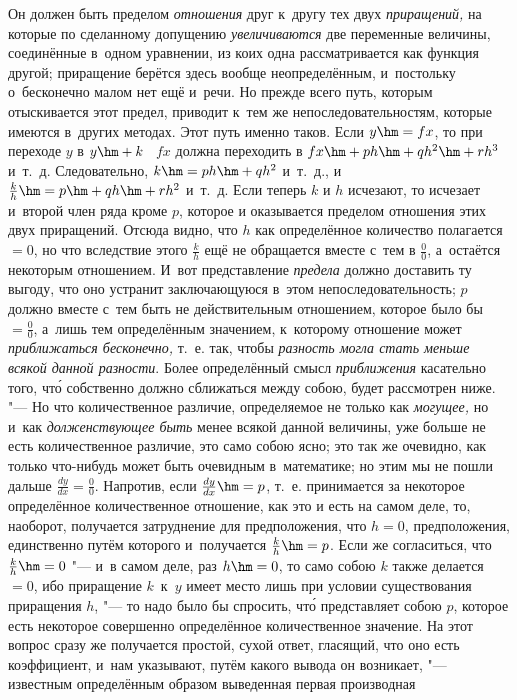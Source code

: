 Он должен быть пределом {\em отношения} друг к~другу тех двух {\em приращений,}
на которые по сделанному допущению {\em увеличиваются} две переменные величины,
соединённые в~одном уравнении, из коих одна рассматривается как функция другой;
приращение берётся здесь вообще неопределённым, и~постольку о~бесконечно малом
нет ещё и~речи. Но прежде всего путь, которым отыскивается этот предел,
приводит к~тем же непоследовательностям, которые имеются в~других методах. Этот
путь именно таков. Если $y\hm=fx$, то при переходе $y$ в $y\hm+k$ \  $fx$
должна переходить в $fx\hm+ph\hm+qh^2\hm+rh^3$ и~т.~д. Следовательно,
$k\hm=ph\hm+qh^2$ и~т.~д., и $\frac k h\hm=p\hm+qh\hm+rh^2$ и~т.~д. Если теперь
$k$ и $h$ исчезают, то исчезает и~второй член ряда кроме $p$, которое и
оказывается пределом отношения этих двух приращений. Отсюда видно, что $h$ как
определённое количество полагается~$=0$, но что вследствие этого $\frac k h$
ещё не обращается вместе с~тем в $\frac 0 0$, а~остаётся некоторым отношением.
И~вот представление {\em предела} должно доставить ту выгоду, что оно устранит
заключающуюся в~этом непоследовательность; $p$ должно вместе с~тем быть не
действительным отношением, которое было бы~$=\frac 0 0$, а~лишь тем
определённым значением, к~которому отношение может
{\em приближаться бесконечно,} т.~е. так, чтобы {\em разность могла стать
меньше всякой данной разности}. Более определённый смысл {\em приближения}
касательно того, чт\'{о} собственно должно сближаться между собою, будет рассмотрен
ниже. "--- Но что количественное различие, определяемое не только как
{\em могущее,} но и~как {\em долженствующее быть} менее всякой данной величины,
уже больше не есть количественное различие, это само собою ясно; это так же
очевидно, как только что-нибудь может быть очевидным в~математике; но этим мы
не пошли дальше $\frac{dy}{dx}=\frac 0 0$. Напротив, если $\frac{dy}{dx}\hm=p$,
т.~е. принимается за некоторое определённое количественное отношение, как это и
есть на самом деле, то, наоборот, получается затруднение для предположения, что
$h=0$, предположения, единственно путём которого и~получается $\frac k h\hm=p$.
Если же согласиться, что $\frac k h\hm=0$ "--- и~в самом деле, раз $h\hm=0$, то
само собою $k$ также делается~$=0$, ибо приращение $k$~к~$y$ имеет место лишь
при условии существования приращения $h$, "--- то надо было бы спросить,
чт\'{о} представляет собою $p$, которое есть некоторое совершенно определённое
количественное значение. На этот вопрос сразу же получается простой, сухой
ответ, гласящий, что оно есть коэффициент, и~нам указывают, путём какого вывода
он возникает, "--- известным определённым образом выведенная первая производная
